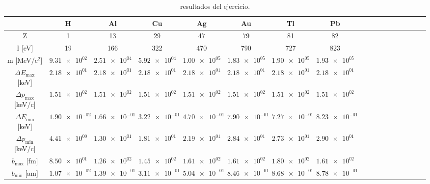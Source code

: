 \begin{table}
\caption{resultados del ejercicio.}
\label{Tab:02-ex03}
\begin{tabular}{cccccccccccccccccc}
\toprule
 & H & Al & Cu & Ag & Au & Tl & Pb \\
\midrule
Z & 1 & 13 & 29 & 47 & 79 & 81 & 82 \\
I [eV] & 19 & 166 & 322 & 470 & 790 & 727 & 823 \\
m [MeV/c$^2$] & $\SI{9.31e+02}{}$ & $\SI{2.51e+04}{}$ & $\SI{5.92e+04}{}$ & $\SI{1.00e+05}{}$ & $\SI{1.83e+05}{}$ & $\SI{1.90e+05}{}$ & $\SI{1.93e+05}{}$ \\
$\Delta E_{\max}$ [keV] & $\SI{2.18e+01}{}$ & $\SI{2.18e+01}{}$ & $\SI{2.18e+01}{}$ & $\SI{2.18e+01}{}$ & $\SI{2.18e+01}{}$ & $\SI{2.18e+01}{}$ & $\SI{2.18e+01}{}$ \\
$\Delta p_{\max}$ [keV/c] & $\SI{1.51e+02}{}$ & $\SI{1.51e+02}{}$ & $\SI{1.51e+02}{}$ & $\SI{1.51e+02}{}$ & $\SI{1.51e+02}{}$ & $\SI{1.51e+02}{}$ & $\SI{1.51e+02}{}$ \\
$\Delta E_{\min}$ [keV] & $\SI{1.90e-02}{}$ & $\SI{1.66e-01}{}$ & $\SI{3.22e-01}{}$ & $\SI{4.70e-01}{}$ & $\SI{7.90e-01}{}$ & $\SI{7.27e-01}{}$ & $\SI{8.23e-01}{}$ \\
$\Delta p_{\min}$ [keV/c] & $\SI{4.41e+00}{}$ & $\SI{1.30e+01}{}$ & $\SI{1.81e+01}{}$ & $\SI{2.19e+01}{}$ & $\SI{2.84e+01}{}$ & $\SI{2.73e+01}{}$ & $\SI{2.90e+01}{}$ \\
$b_{\max}$ [fm] & $\SI{8.50e+01}{}$ & $\SI{1.26e+02}{}$ & $\SI{1.45e+02}{}$ & $\SI{1.61e+02}{}$ & $\SI{1.61e+02}{}$ & $\SI{1.80e+02}{}$ & $\SI{1.61e+02}{}$ \\
$b_{\min}$ [am] & $\SI{1.07e-02}{}$ & $\SI{1.39e-01}{}$ & $\SI{3.11e-01}{}$ & $\SI{5.04e-01}{}$ & $\SI{8.46e-01}{}$ & $\SI{8.68e-01}{}$ & $\SI{8.78e-01}{}$ \\
\bottomrule
\end{tabular}
\end{table}
